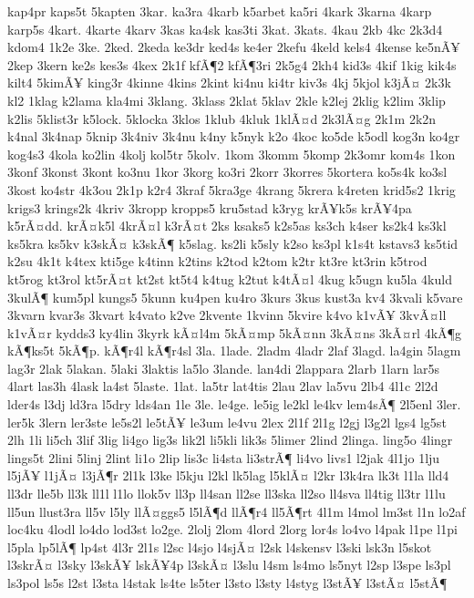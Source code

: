 {kap4pr
kaps5t
5kapten
3kar.
ka3ra
4karb
k5arbet
ka5ri
4kark
3karna
4karp
karp5s
4kart.
4karte
4karv
3kas
ka4sk
kas3ti
3kat.
3kats.
4kau
2kb
4kc
2k3d4
kdom4
1k2e
3ke.
2ked.
2keda
ke3dr
ked4s
ke4er
2kefu
4keld
kels4
4kense
ke5nÃ¥
2kep
3kern
ke2s
kes3s
4kex
2k1f
kfÃ¶2
kfÃ¶3ri
2k5g4
2kh4
kid3s
4kif
1kig
kik4s
kilt4
5kimÃ¥
king3r
4kinne
4kins
2kint
ki4nu
ki4tr
kiv3s
4kj
5kjol
k3jÃ¤
2k3k
kl2
1klag
k2lama
kla4mi
3klang.
3klass
2klat
5klav
2kle
k2lej
2klig
k2lim
3klip
k2lis
5klist3r
k5lock.
5klocka
3klos
1klub
4kluk
1klÃ¤d
2k3lÃ¤g
2k1m
2k2n
k4nal
3k4nap
5knip
3k4niv
3k4nu
k4ny
k5nyk
k2o
4koc
ko5de
k5odl
kog3n
ko4gr
kog4s3
4kola
ko2lin
4kolj
kol5tr
5kolv.
1kom
3komm
5komp
2k3omr
kom4s
1kon
3konf
3konst
3kont
ko3nu
1kor
3korg
ko3ri
2korr
3korres
5kortera
ko5s4k
ko3sl
3kost
ko4str
4k3ou
2k1p
k2r4
3kraf
5kra3ge
4krang
5krera
k4reten
krid5s2
1krig
krigs3
krings2k
4kriv
3kropp
kropps5
kru5stad
k3ryg
krÃ¥k5s
krÃ¥4pa
k5rÃ¤dd.
krÃ¤k5l
4krÃ¤l
k3rÃ¤t
2ks
ksaks5
k2s5as
ks3ch
k4ser
ks2k4
ks3kl
ks5kra
ks5kv
k3skÃ¤
k3skÃ¶
k5slag.
ks2li
k5sly
k2so
ks3pl
k1s4t
kstavs3
ks5tid
k2su
4k1t
k4tex
kti5ge
k4tinn
k2tins
k2tod
k2tom
k2tr
kt3re
kt3rin
k5trod
kt5rog
kt3rol
kt5rÃ¤t
kt2st
kt5t4
k4tug
k2tut
k4tÃ¤l
4kug
k5ugn
ku5la
4kuld
3kulÃ¶
kum5pl
kungs5
5kunn
ku4pen
ku4ro
3kurs
3kus
kust3a
kv4
3kvali
k5vare
3kvarn
kvar3s
3kvart
k4vato
k2ve
2kvente
1kvinn
5kvire
k4vo
k1vÃ¥
3kvÃ¤ll
k1vÃ¤r
kydds3
ky4lin
3kyrk
kÃ¤l4m
5kÃ¤mp
5kÃ¤nn
3kÃ¤ns
3kÃ¤rl
4kÃ¶g
kÃ¶ks5t
5kÃ¶p.
kÃ¶r4l
kÃ¶r4sl
3la.
1lade.
2ladm
4ladr
2laf
3lagd.
la4gin
5lagm
lag3r
2lak
5lakan.
5laki
3laktis
la5lo
3lande.
lan4di
2lappara
2larb
1larn
lar5s
4lart
las3h
4lask
la4st
5laste.
1lat.
la5tr
lat4tis
2lau
2lav
la5vu
2lb4
4l1c
2l2d
lder4s
l3dj
ld3ra
l5dry
lds4an
1le
3le.
le4ge.
le5ig
le2kl
le4kv
lem4sÃ¶
2l5enl
3ler.
ler5k
3lern
ler3ste
le5s2l
le5tÃ¥
le3um
le4vu
2lex
2l1f
2l1g
l2gj
l3g2l
lgs4
lg5st
2lh
1li
li5ch
3lif
3lig
li4go
lig3s
lik2l
li5kli
lik3s
5limer
2lind
2linga.
ling5o
4lingr
lings5t
2lini
5linj
2lint
li1o
2lip
lis3c
li4sta
li3strÃ¶
li4vo
livs1
l2jak
4l1jo
1lju
l5jÃ¥
l1jÃ¤
l3jÃ¶r
2l1k
l3ke
l5kju
l2kl
lk5lag
l5klÃ¤
l2kr
l3k4ra
lk3t
l1la
lld4
ll3dr
lle5b
ll3k
ll1l
l1lo
llok5v
ll3p
ll4san
ll2se
ll3ska
ll2so
ll4sva
ll4tig
ll3tr
l1lu
ll5un
llust3ra
ll5v
l5ly
llÃ¤ggs5
l5lÃ¶d
llÃ¶r4
ll5Ã¶rt
4l1m
l4mol
lm3st
l1n
lo2af
loc4ku
4lodl
lo4do
lod3st
lo2ge.
2lolj
2lom
4lord
2lorg
lor4s
lo4vo
l4pak
l1pe
l1pi
l5pla
lp5lÃ¶
lp4st
4l3r
2l1s
l2sc
l4sjo
l4sjÃ¤
l2sk
l4skensv
l3ski
lsk3n
l5skot
l3skrÃ¤
l3sky
l3skÃ¥
lskÃ¥4p
l3skÃ¤
l3slu
l4sm
ls4mo
ls5nyt
l2sp
l3spe
ls3pl
ls3pol
ls5s
l2st
l3sta
l4stak
ls4te
ls5ter
l3sto
l3sty
l4styg
l3stÃ¥
l3stÃ¤
l5stÃ¶
}

